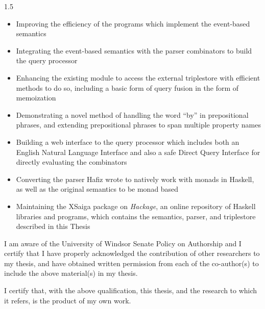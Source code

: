 \documentclass[fleqn, oneside, 12pt]{book}
\theoremstyle{definitionsty}
\newcommand{\uwinonehalfspacelen}{1.5}
\newcommand{\uwindefaultspacelen}{\uwinonehalfspacelen}
\newenvironment{uwindefaultspaceenv}%
{\begin{spacing}{\uwindefaultspacelen}}%
	{\end{spacing}}
\begin{document}
\begin{uwindefaultspaceenv}
	\begin{itemize}
		\item Improving the efficiency of the programs which implement the event-based semantics
		\item Integrating the event-based semantics with the parser combinators to build the query processor
		\item Enhancing the existing module to access the external triplestore with efficient methods to do so, including a basic form of query fusion in the form of memoization
		\item Demonstrating a novel method of handling the word ``by'' in prepositional phrases, and extending prepositional phrases to span multiple property names
		\item Building a web interface to the query processor which includes both an English Natural Language Interface and also a safe Direct Query Interface for directly evaluating the combinators
		\item Converting the parser Hafiz wrote\cite{frosthafiz2008} to natively work with monads in Haskell, as well as the original semantics\cite{frost2014demonstration} to be monad based
		\item Maintaining the XSaiga package on {\em Hackage}\cite{XSaiga:2016}, an online repository of Haskell libraries and programs, which contains the semantics, parser, and triplestore described in this Thesis
	\end{itemize}
	
	I am aware of the University of Windsor Senate Policy on Authorship and I certify that I have properly acknowledged the contribution of other researchers to my thesis, and have obtained written permission from each of the co-author(s) to include the above material(s) in my thesis. 
	
	I certify that, with the above qualification, this thesis, and the research to which it refers, is the product of my own work.
	
\end{uwindefaultspaceenv}
\end{document}
